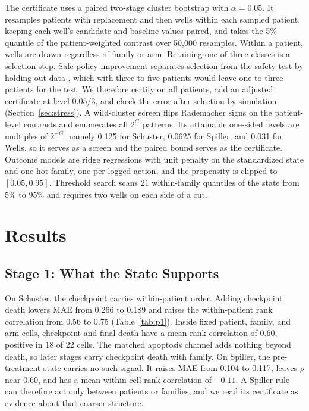\documentclass[conference]{IEEEtran}
\begin{document}
The certificate uses a paired two-stage cluster bootstrap with \(\alpha=0.05\). It resamples patients with replacement and then wells within each sampled patient, keeping each well's candidate and baseline values paired, and takes the 5\% quantile of the patient-weighted contrast over 50,000 resamples. Within a patient, wells are drawn regardless of family or arm. Retaining one of three classes is a selection step. Safe policy improvement separates selection from the safety test by holding out data \cite{thomas2015}, which with three to five patients would leave one to three patients for the test. We therefore certify on all patients, add an adjusted certificate at level \(0.05/3\), and check the error after selection by simulation (Section~\ref{sec:stress}). A wild-cluster screen flips Rademacher signs on the patient-level contrasts and enumerates all \(2^G\) patterns. Its attainable one-sided levels are multiples of \(2^{-G}\), namely 0.125 for Schuster, 0.0625 for Spiller, and 0.031 for Wells, so it serves as a screen and the paired bound serves as the certificate. Outcome models are ridge regressions with unit penalty on the standardized state and one-hot family, one per logged action, and the propensity is clipped to \([0.05,0.95]\). Threshold search scans 21 within-family quantiles of the state from 5\% to 95\% and requires two wells on each side of a cut.

\section{Results}

\subsection{Stage 1: What the State Supports}

On Schuster, the checkpoint carries within-patient order. Adding checkpoint death lowers MAE from 0.266 to 0.189 and raises the within-patient rank correlation from 0.56 to 0.75 (Table~\ref{tab:p1}). Inside fixed patient, family, and arm cells, checkpoint and final death have a mean rank correlation of 0.60, positive in 18 of 22 cells. The matched apoptosis channel adds nothing beyond death, so later stages carry checkpoint death with family. On Spiller, the pre-treatment state carries no such signal. It raises MAE from 0.104 to 0.117, leaves \(\rho\) near 0.60, and has a mean within-cell rank correlation of \(-0.11\). A Spiller rule can therefore act only between patients or families, and we read its certificate as evidence about that coarser structure.
\end{document}
